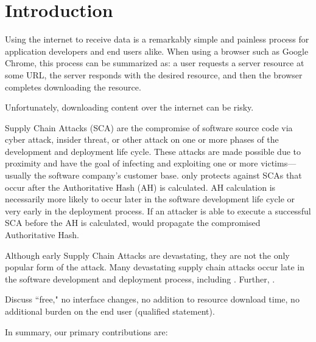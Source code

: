 \section{Introduction} \label{sec:introduction}

Using the internet to receive data is a remarkably simple and painless process
for application developers and end users alike. When using a browser such as
Google Chrome, this process can be summarized as: a user requests a server
resource at some URL, the server responds with the desired resource, and then
the browser completes downloading the resource.

Unfortunately, downloading content over the internet can be risky.

Supply Chain Attacks (SCA) are the compromise of software source code via cyber
attack, insider threat, or other attack on one or more phases of the development
and deployment life cycle. These attacks are made possible due to proximity and
have the goal of infecting and exploiting one or more victims---usually the
software company's customer base. \SYSTEM{} only protects against SCAs that
occur after the Authoritative Hash (AH) is calculated. AH calculation is
necessarily more likely to occur later in the software development life cycle or
very early in the deployment process. If an attacker is able to execute a
successful SCA before the AH is calculated, \SYSTEM{} would propagate the
compromised Authoritative Hash.


Although early Supply Chain Attacks are devastating, they are not the only
popular form of the attack. Many devastating supply chain attacks occur late in
the software development and deployment process, including . Further, .

Discuss ``free," \ie no interface changes, no addition to resource download
time, no additional burden on the end user (qualified statement).~\cite{DNSSEC}

In summary, our primary contributions are:

